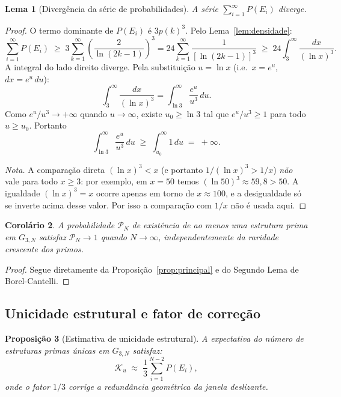 \documentclass{article}
\newtheorem{proposition}{Proposição}[section]
\newtheorem{lemma}[proposition]{Lema}
\newtheorem{corollary}[proposition]{Corolário}
\begin{document}
	\begin{lemma}[Divergência da série de probabilidades]
		\label{lem:divergencia}
		A série $\sum_{i=1}^{\infty} P(E_i)$ diverge.
	\end{lemma}
	
	\begin{proof}
		O termo dominante de $P(E_i)$ é $3p(k)^3$. Pelo
		Lema~\ref{lem:densidade}:
		\[
		\sum_{i=1}^{\infty} P(E_i)
		\;\geq\; 3\sum_{k=1}^{\infty}
		\left(\frac{2}{\ln(2k-1)}\right)^3
		= 24\sum_{k=1}^{\infty} \frac{1}{[\ln(2k-1)]^3}
		\;\geq\; 24\int_{3}^{\infty}\frac{dx}{(\ln x)^3}.
		\]
		A integral do lado direito diverge. Pela substituição
		$u = \ln x$ (i.e.\ $x = e^u$, $dx = e^u\,du$):
		\[
		\int_{3}^{\infty}\frac{dx}{(\ln x)^3}
		= \int_{\ln 3}^{\infty}\frac{e^u}{u^3}\,du.
		\]
		Como $e^u/u^3 \to +\infty$ quando $u \to \infty$, existe
		$u_0 \geq \ln 3$ tal que $e^u/u^3 \geq 1$ para todo $u \geq u_0$.
		Portanto
		\[
		\int_{\ln 3}^{\infty}\frac{e^u}{u^3}\,du
		\;\geq\; \int_{u_0}^{\infty} 1\,du \;=\; +\infty.
		\]
		
		\smallskip
		\noindent\textit{Nota.}
		A comparação direta $(\ln x)^3 < x$ (e portanto
		$1/(\ln x)^3 > 1/x$) \emph{não} vale para todo $x \geq 3$:
		por exemplo, em $x = 50$ temos $(\ln 50)^3 \approx 59{,}8 > 50$.
		A igualdade $(\ln x)^3 = x$ ocorre apenas em torno de
		$x \approx 100$, e a desigualdade só se inverte acima desse valor.
		Por isso a comparação com $1/x$ não é usada aqui.
	\end{proof}
	
	\begin{corollary}
		\label{cor:quasecerto}
		A probabilidade $\mathcal{P}_N$ de existência de ao menos uma
		estrutura prima em $G_{3,N}$ satisfaz $\mathcal{P}_N \to 1$
		quando $N \to \infty$, independentemente da raridade crescente
		dos primos.
	\end{corollary}
	
	\begin{proof}
		Segue diretamente da Proposição~\ref{prop:principal} e do
		Segundo Lema de Borel-Cantelli.
	\end{proof}
	
	\subsection{Unicidade estrutural e fator de correção}
	
	\begin{proposition}[Estimativa de unicidade estrutural]
		\label{prop:unicidade}
		A expectativa do número de estruturas primas \emph{únicas}
		em $G_{3,N}$ satisfaz:
		\[
		\mathcal{K}_u \;\approx\; \frac{1}{3}\sum_{i=1}^{N-2} P(E_i),
		\]
		onde o fator $1/3$ corrige a redundância geométrica da janela
		deslizante.
	\end{proposition}
	
\end{document}
